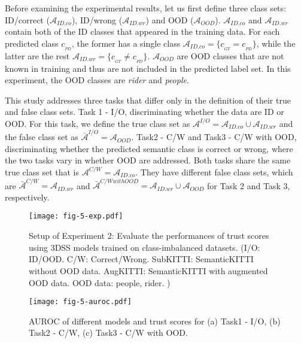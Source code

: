 \documentclass[journal]{IEEEtran}
\begin{document}
Before examining the experimental results, let us first define three class sets: ID/correct ($\mathcal{A}_{ID.co}$), ID/wrong ($\mathcal{A}_{ID.wr}$) and OOD ($\mathcal{A}_{OOD}$).
$\mathcal{A}_{ID.co}$ and $\mathcal{A}_{ID.wr}$ contain both of the ID classes that appeared in the training data.
For each predicted class $c_{_{PD}}$, the former has a single class $\mathcal{A}_{ID.co}=\{c_{_{GT}}=c_{_{PD}}\}$, while the latter are the rest $\mathcal{A}_{ID.wr}=\{c_{_{GT}} \neq c_{_{PD}}\}$.
$\mathcal{A}_{OOD}$ are OOD classes that are not known in training and thus are not included in the predicted label set. In this experiment, the OOD classes are \textit{rider} and \textit{people}.

This study addresses three tasks that differ only in the definition of their true and false class sets.
Task 1 - I/O, discriminating whether the data are ID or OOD. For this task, we define the true class set as $\mathcal{A}^{I/O}=\mathcal{A}_{ID.co} \cup \mathcal{A}_{ID.wr}$ and the false class set as $\mathcal{\bar{A}}^{I/O}=\mathcal{A}_{OOD}$.
Task2 - C/W and Task3 - C/W with OOD, discriminating whether the predicted semantic class is correct or wrong, where the two tasks vary in whether OOD are addressed.
Both tasks share the same true class set that is $\mathcal{A}^{C/W}=\mathcal{A}_{ID.co}$.
They have different false class sets, which are $\mathcal{\bar{A}}^{C/W}=\mathcal{A}_{ID.wr}$ and $\mathcal{\bar{A}}^{C/W with OOD}=\mathcal{A}_{ID.wr} \cup \mathcal{A}_{OOD}$ for Task 2 and Task 3, respectively.

\begin{figure}[t]
	\centering
	\texttt{[image: fig-5-exp.pdf]}
	\vspace{-3mm}
	\caption{Setup of Experiment 2: Evaluate the performances of trust scores using 3DSS models trained on class-imbalanced datasets. (I/O: ID/OOD. C/W: Correct/Wrong. SubKITTI: SemanticKITTI without OOD data. AugKITTI: SemanticKITTI with augmented OOD data. OOD data: people, rider. )}
	\label{fig:exp2}
	\vspace{-4mm}
\end{figure}

\begin{figure*}[t]
	\centering
	\texttt{[image: fig-5-auroc.pdf]}
	\vspace{-4mm}
	\caption{AUROC of different models and trust scores for (a) Task1 - I/O, (b) Task2 - C/W, (c) Task3 - C/W with OOD.}
	\label{fig:auroc}
	\vspace{-4mm}
\end{figure*}
\end{document}
